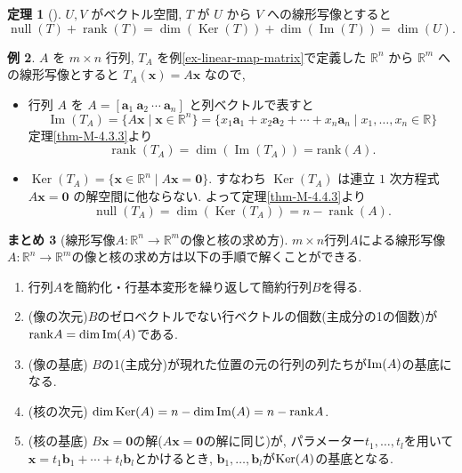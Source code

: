 \documentclass[dvipdfmx,a4paper,11pt]{article} %
\newcommand{\R}{\mathbb{R}}
\theoremstyle{definition}
\newtheorem{thm}{定理}[section]
\newtheorem{eg}[thm]{例}
\newtheorem{suma}[thm]{まとめ}
\begin{document}
\begin{thm}[{\cite[定理5.1.2]{M}}]
\label{thm-M-5.1.2}
\(U,V\) がベクトル空間, \(T\) が \(U\) から \(V\) への線形写像とすると
\[
\operatorname{null}(T)+\operatorname{rank}(T)
=
\dim(\operatorname{Ker}(T))+\dim(\operatorname{Im}(T))=\dim(U).
\]
\end{thm}

\begin{eg}%
\(A\) を \(m\times n\) 行列, \(T_A\) を例\ref{ex-linear-map-matrix}で定義した \(\mathbb{R}^n\) から \(\mathbb{R}^m\) への線形写像とすると \(T_A(\bm{x})=A\bm{x}\) なので, 
\begin{itemize}
\item 行列 \(A\) を
$
A=[\bm{a}_1\ \bm{a}_2\ \cdots\ \bm{a}_n]
$
と列ベクトルで表すと
$$\operatorname{Im}(T_A)=\{A\bm{x}\mid \bm{x}\in\mathbb{R}^n\}=
\{x_1\bm{a}_1+x_2\bm{a}_2+\cdots+x_n\bm{a}_n \mid
x_1,\ldots,x_n\in\mathbb{R}\}
$$
定理\ref{thm-M-4.3.3}より
$$\operatorname{rank}(T_A)=\dim(\operatorname{Im}(T_A))=\mathrm{rank}(A).$$
\item\(
\operatorname{Ker}(T_A)
=
\{\bm{x}\in\mathbb{R}^n\mid A\bm{x}=\bm{0}\}.
\)
すなわち \(\operatorname{Ker}(T_A)\) は連立 \(1\) 次方程式 \(A\bm{x}=\bm{0}\) の解空間に他ならない. よって定理\ref{thm-M-4.4.3}より
\[
\operatorname{null}(T_A)
=\dim(\operatorname{Ker}(T_A))=
n-\operatorname{rank}(A).
\]
\end{itemize}
\end{eg}



\begin{suma}[線形写像$A : \R^n \to \R^m$の像と核の求め方]
\label{suma-gauss}
$m \times n$行列$A$による線形写像$A : \R^n \to \R^m$の像と核の求め方は以下の手順で解くことができる. 
\begin{enumerate}
   \setlength{\parskip}{0cm} 
  \setlength{\itemsep}{0cm}
 \item 行列$A$を簡約化・行基本変形を繰り返して簡約行列$B$を得る.
 \item (像の次元)$B$のゼロベクトルでない行ベクトルの個数(主成分の1の個数)が${\rm rank}A=\dim {\rm Im}(A)$である.
 \item (像の基底) $B$の1(主成分)が現れた位置の元の行列の列たちが${\rm Im}(A)$の基底になる.
 \item (核の次元) $\dim {\rm Ker}(A) = n-\dim {\rm Im}(A)=n-{\rm rank}A$.
 \item (核の基底) $B \bm{x}=\bm{0}$の解($A\bm{x}=\bm{0}$の解に同じ)が, パラメーター$t_1, \ldots, t_l$を用いて$\bm{x}=t_1\bm{b}_1+\cdots+t_l\bm{b}_l$とかけるとき, $\bm{b}_1, \ldots, \bm{b}_l$が${\rm Ker}(A)$の基底となる.
 \end{enumerate}
\end{suma}
\end{document}

